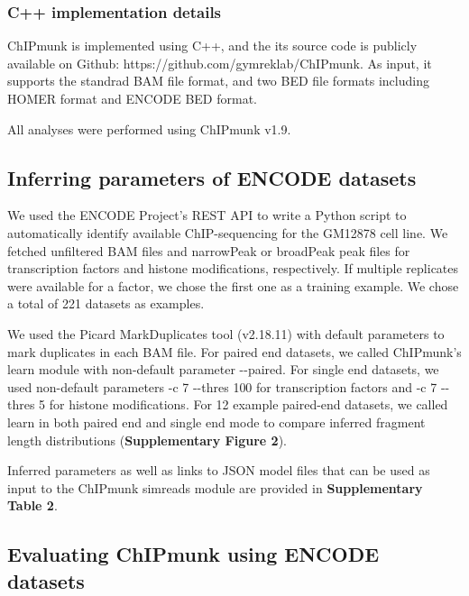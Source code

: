 \documentclass[12pt]{article}
\begin{document}
\subsubsection*{C++ implementation details}
ChIPmunk is implemented using C++, and the its source code is publicly available on Github: https://github.com/gymreklab/ChIPmunk.
As input, it supports the standrad BAM file format, and two BED file formats including HOMER format and ENCODE BED format.

All analyses were performed using ChIPmunk v1.9. %

\subsection*{Inferring parameters of ENCODE datasets}

We used the ENCODE Project's REST API to write a Python script to automatically identify available ChIP-sequencing for the GM12878 cell line.
We fetched unfiltered BAM files and narrowPeak or broadPeak peak files for transcription factors and histone modifications, respectively.
If multiple replicates were available for a factor, we chose the first one as a training example.
We chose a total of 221 datasets as examples.

We used the Picard \cite{picard} MarkDuplicates tool (v2.18.11) with default parameters to mark duplicates in each BAM file.
For paired end datasets, we called ChIPmunk's learn module with non-default parameter -{}-paired.
For single end datasets, we used non-default parameters -c 7 -{}-thres 100 for transcription factors and -c 7 -{}-thres 5 for histone modifications.
For 12 example paired-end datasets, we called learn in both paired end and single end mode to compare inferred fragment length distributions (\textbf{Supplementary Figure 2}).

Inferred parameters as well as links to JSON model files that can be used as input to the ChIPmunk simreads module are provided in \textbf{Supplementary Table 2}.

\subsection*{Evaluating ChIPmunk using ENCODE datasets}
\end{document}
